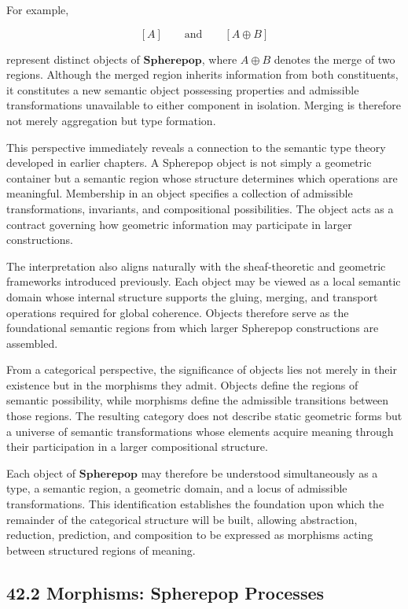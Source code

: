 \documentclass[12pt,letterpaper]{article}
\theoremstyle{remark}
\begin{document}
For example,

\[
[A]
\qquad\text{and}\qquad
[A \oplus B]
\]

represent distinct objects of $\mathbf{Spherepop}$, where $A \oplus B$ denotes the merge of two regions. Although the merged region inherits information from both constituents, it constitutes a new semantic object possessing properties and admissible transformations unavailable to either component in isolation. Merging is therefore not merely aggregation but type formation.

This perspective immediately reveals a connection to the semantic type theory developed in earlier chapters. A Spherepop object is not simply a geometric container but a semantic region whose structure determines which operations are meaningful. Membership in an object specifies a collection of admissible transformations, invariants, and compositional possibilities. The object acts as a contract governing how geometric information may participate in larger constructions.

The interpretation also aligns naturally with the sheaf-theoretic and geometric frameworks introduced previously. Each object may be viewed as a local semantic domain whose internal structure supports the gluing, merging, and transport operations required for global coherence. Objects therefore serve as the foundational semantic regions from which larger Spherepop constructions are assembled.

From a categorical perspective, the significance of objects lies not merely in their existence but in the morphisms they admit. Objects define the regions of semantic possibility, while morphisms define the admissible transitions between those regions. The resulting category does not describe static geometric forms but a universe of semantic transformations whose elements acquire meaning through their participation in a larger compositional structure.

Each object of $\mathbf{Spherepop}$ may therefore be understood simultaneously as a type, a semantic region, a geometric domain, and a locus of admissible transformations. This identification establishes the foundation upon which the remainder of the categorical structure will be built, allowing abstraction, reduction, prediction, and composition to be expressed as morphisms acting between structured regions of meaning.

\subsection{42.2 Morphisms: Spherepop Processes}
\end{document}
